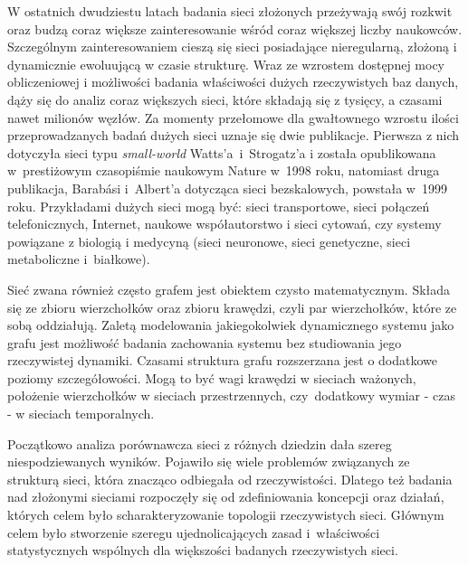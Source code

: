 \documentclass[12pt, twoside, final, openany]{mgr}
\begin{document}
\indent W ostatnich dwudziestu latach badania sieci złożonych przeżywają swój rozkwit oraz budzą coraz większe zainteresowanie wśród coraz większej liczby naukowców. Szczególnym zainteresowaniem cieszą się sieci posiadające nieregularną, złożoną i dynamicznie ewoluującą w czasie strukturę. Wraz ze wzrostem dostępnej mocy obliczeniowej i możliwości badania właściwości dużych rzeczywistych baz danych, dąży się do analiz coraz większych sieci, które składają się z tysięcy, a czasami nawet milionów węzłów. Za momenty przełomowe dla gwałtownego wzrostu ilości przeprowadzanych badań dużych sieci uznaje się dwie publikacje. Pierwsza z nich dotyczyła sieci typu \textit{small-world} Watts'a~i~Strogatz'a i została opublikowana w~prestiżowym czasopiśmie naukowym Nature w~1998 roku, natomiast druga publikacja, Barab{\'a}si i~Albert'a dotycząca sieci bezskalowych, powstała w~1999 roku\cite{Watts1998, Barabasi1999}. Przykładami dużych sieci mogą być: sieci transportowe, sieci połączeń telefonicznych, Internet, naukowe współautorstwo i sieci cytowań, czy systemy powiązane z biologią i medycyną (sieci neuronowe, sieci genetyczne, sieci metaboliczne i~białkowe). 

\indent Sieć zwana również często grafem jest obiektem czysto matematycznym. Składa się ze zbioru wierzchołków oraz zbioru krawędzi, czyli par wierzchołków, które ze sobą oddziałują. Zaletą modelowania jakiegokolwiek dynamicznego systemu jako grafu jest możliwość badania zachowania systemu bez studiowania jego rzeczywistej dynamiki. Czasami struktura grafu rozszerzana jest o dodatkowe poziomy szczegółowości. Mogą to być wagi krawędzi w sieciach ważonych, położenie wierzchołków w sieciach przestrzennych, czy~dodatkowy wymiar - czas - w sieciach temporalnych.

\indent Początkowo analiza porównawcza sieci z różnych dziedzin dała szereg niespodziewanych wyników. Pojawiło się wiele problemów związanych ze strukturą sieci, która znacząco odbiegała od rzeczywistości. Dlatego też badania nad złożonymi sieciami rozpoczęły się od zdefiniowania koncepcji oraz działań, których celem było scharakteryzowanie topologii rzeczywistych sieci. Głównym celem było stworzenie szeregu ujednolicających zasad i~właściwości statystycznych wspólnych dla większości badanych rzeczywistych sieci. 
\end{document}
